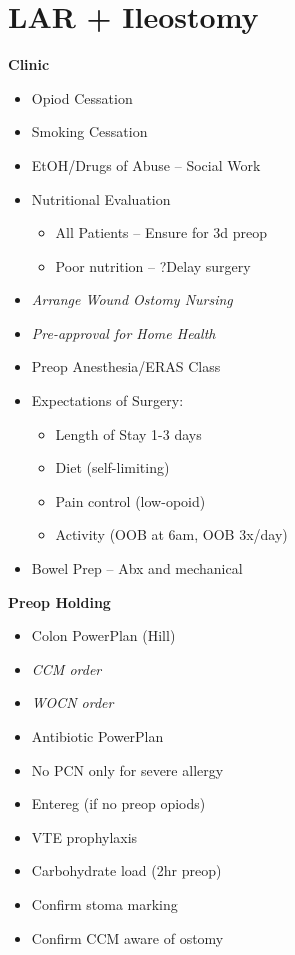 \documentclass[
  letterpaper,
]{scrbook}
\providecommand{\tightlist}{%
  \setlength{\itemsep}{0pt}\setlength{\parskip}{0pt}}
\begin{document}
\chapter{LAR + Ileostomy}\label{lar-ileostomy}

\textbf{Clinic}

\begin{itemize}
\tightlist
\item
  Opiod Cessation
\item
  Smoking Cessation
\item
  EtOH/Drugs of Abuse -- Social Work
\item
  Nutritional Evaluation

  \begin{itemize}
  \tightlist
  \item
    All Patients -- Ensure for 3d preop
  \item
    Poor nutrition -- ?Delay surgery
  \end{itemize}
\item
  \emph{Arrange Wound Ostomy Nursing}
\item
  \emph{Pre-approval for Home Health}
\item
  Preop Anesthesia/ERAS Class
\item
  Expectations of Surgery:

  \begin{itemize}
  \tightlist
  \item
    Length of Stay 1-3 days
  \item
    Diet (self-limiting)
  \item
    Pain control (low-opoid)
  \item
    Activity (OOB at 6am, OOB 3x/day)
  \end{itemize}
\item
  Bowel Prep -- Abx and mechanical
\end{itemize}

\textbf{Preop Holding}

\begin{itemize}
\tightlist
\item
  Colon PowerPlan (Hill)
\item
  \emph{CCM order}
\item
  \emph{WOCN order}
\item
  Antibiotic PowerPlan
\item
  No PCN only for severe allergy
\item
  Entereg (if no preop opiods)
\item
  VTE prophylaxis
\item
  Carbohydrate load (2hr preop)
\item
  Confirm stoma marking
\item
  Confirm CCM aware of ostomy
\end{itemize}
\end{document}
